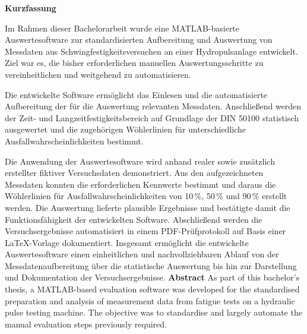 \cleardoublepage






\cleardoublepage

{\LARGE\textsf{\textbf{Kurzfassung}}}
\vskip0.5cm

\relax
Im Rahmen dieser Bachelorarbeit wurde eine MATLAB-basierte Auswertesoftware zur standardisierten Aufbereitung und Auswertung von Messdaten aus Schwingfestigkeitsversuchen an einer Hydropulsanlage entwickelt. Ziel war es, die bisher erforderlichen manuellen Auswertungsschritte zu vereinheitlichen und weitgehend zu automatisieren.

Die entwickelte Software ermöglicht das Einlesen und die automatisierte Aufbereitung der für die Auswertung relevanten Messdaten. Anschließend werden der Zeit- und Langzeitfestigkeitsbereich auf Grundlage der DIN 50100 statistisch ausgewertet und die zugehörigen Wöhlerlinien für unterschiedliche Ausfallwahrscheinlichkeiten bestimmt.

Die Anwendung der Auswertesoftware wird anhand realer sowie zusätzlich erstellter fiktiver Versuchsdaten demonstriert. Aus den aufgezeichneten Messdaten konnten die erforderlichen Kennwerte bestimmt und daraus die Wöhlerlinien für Ausfallwahrscheinlichkeiten von 10\,\%, 50\,\% und 90\,\% erstellt werden. Die Auswertung lieferte plausible Ergebnisse und bestätigte damit die Funktionsfähigkeit der entwickelten Software. Abschließend werden die Versuchsergebnisse automatisiert in einem PDF-Prüfprotokoll auf Basis einer LaTeX-Vorlage dokumentiert. Insgesamt ermöglicht die entwickelte Auswertesoftware einen einheitlichen und nachvollziehbaren Ablauf von der Messdatenaufbereitung über die statistische Auswertung bis hin zur Darstellung und Dokumentation der Versuchsergebnisse.
\vfill
{\LARGE\textsf{\textbf{Abstract}}}
\vskip0.5cm
\relax
As part of this bachelor's thesis, a MATLAB-based evaluation software was developed for the standardised preparation and analysis of measurement data from fatigue tests on a hydraulic pulse testing machine. The objective was to standardise and largely automate the manual evaluation steps previously required. 

